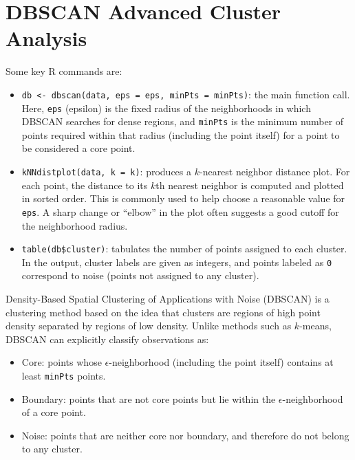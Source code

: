 \section{DBSCAN Advanced Cluster Analysis}

\medskip

Some key R commands are:
\begin{itemize}
    \item \texttt{db <- dbscan(data, eps = eps, minPts = minPts)}: the main function call. Here, \texttt{eps} (epsilon) is the fixed radius of the neighborhoods in which DBSCAN searches for dense regions, and \texttt{minPts} is the minimum number of points required within that radius (including the point itself) for a point to be considered a core point.

    \item \texttt{kNNdistplot(data, k = k)}: produces a $k$-nearest neighbor distance plot. For each point, the distance to its $k$th nearest neighbor is computed and plotted in sorted order. This is commonly used to help choose a reasonable value for \texttt{eps}. A sharp change or ``elbow'' in the plot often suggests a good cutoff for the neighborhood radius.

    \item \texttt{table(db\$cluster)}: tabulates the number of points assigned to each cluster. In the output, cluster labels are given as integers, and points labeled as \texttt{0} correspond to noise (points not assigned to any cluster).
\end{itemize}

\medskip


Density-Based Spatial Clustering of Applications with Noise (DBSCAN) is a clustering method based on the idea that clusters are regions of high point density separated by regions of low density. Unlike methods such as $k$-means, DBSCAN can explicitly classify observations as:

\begin{itemize}[label=--]
    \item Core: points whose $\epsilon$-neighborhood (including the point itself) contains at least \texttt{minPts} points.
    \item Boundary: points that are not core points but lie within the $\epsilon$-neighborhood of a core point.
    \item Noise: points that are neither core nor boundary, and therefore do not belong to any cluster.
\end{itemize}

